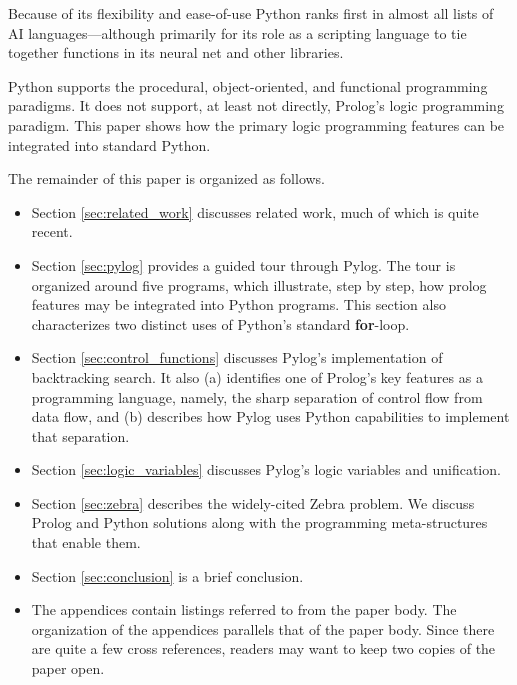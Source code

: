 Because of its flexibility and ease-of-use Python ranks first in almost all lists of AI languages---although primarily for its role as a scripting language to tie together functions in its neural net and other libraries. 

Python supports the procedural, object-oriented, and functional programming paradigms. It does not support, at least not directly, Prolog's logic programming paradigm. This paper shows how the primary logic programming features can be integrated into standard Python.

The remainder of this paper is organized as follows.
\begin{itemize}

 \item Section \ref{sec:related_work} discusses related work, much of which is quite recent.  

 \item Section \ref{sec:pylog} provides a guided tour through Pylog. The tour is organized around five programs, which illustrate, step by step, how prolog features may be integrated into Python programs. This section also characterizes two distinct uses of Python's standard \textbf{for}-loop.

 \item Section \ref{sec:control_functions} discusses Pylog's implementation of backtracking search. It also (a) identifies one of Prolog's key features as a programming language, namely, the sharp separation of control flow from data flow, and (b) describes how Pylog uses Python capabilities to implement that separation.

\item Section \ref{sec:logic_variables} discusses Pylog's logic variables and unification. 

\item Section \ref{sec:zebra} describes the widely-cited Zebra problem. We discuss Prolog and Python solutions along with the programming meta-structures that enable them. 

\item Section \ref{sec:conclusion} is a brief conclusion.  

\item The appendices contain listings referred to from the paper body. The organization of the appendices parallels that of the paper body. Since there are quite a few cross references, readers may want to keep two copies of the paper open.


\end{itemize} 


